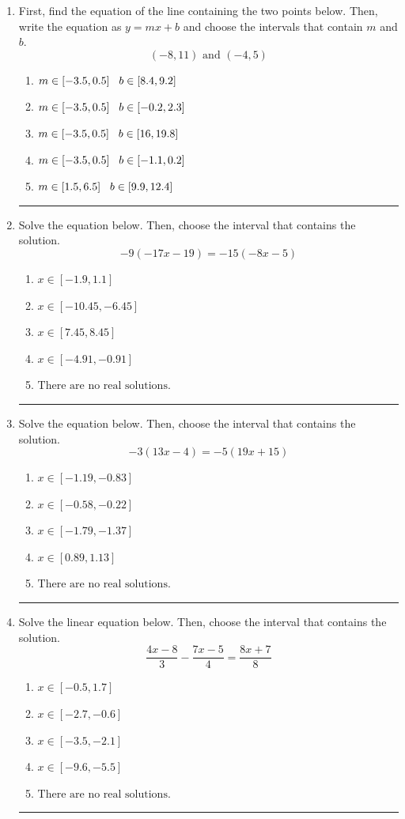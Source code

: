 \documentclass[14pt]{extbook}
\newcommand{\litem}[1]{\item#1\hspace*{-1cm}\rule{\textwidth}{0.4pt}}
\begin{document}
\begin{enumerate}
{\begin{enumerate}[label=\Alph*.]
\end{enumerate} }
\litem{
First, find the equation of the line containing the two points below. Then, write the equation as $ y=mx+b $ and choose the intervals that contain $m$ and $b$.\[ (-8, 11) \text{ and } (-4, 5) \]\begin{enumerate}[label=\Alph*.]
\item \( m \in [-3.5, 0.5] \hspace*{3mm} b \in [8.4, 9.2] \)
\item \( m \in [-3.5, 0.5] \hspace*{3mm} b \in [-0.2, 2.3] \)
\item \( m \in [-3.5, 0.5] \hspace*{3mm} b \in [16, 19.8] \)
\item \( m \in [-3.5, 0.5] \hspace*{3mm} b \in [-1.1, 0.2] \)
\item \( m \in [1.5, 6.5] \hspace*{3mm} b \in [9.9, 12.4] \)

\end{enumerate} }
\litem{
Solve the equation below. Then, choose the interval that contains the solution.\[ -9(-17x -19) = -15(-8x -5) \]\begin{enumerate}[label=\Alph*.]
\item \( x \in [-1.9, 1.1] \)
\item \( x \in [-10.45, -6.45] \)
\item \( x \in [7.45, 8.45] \)
\item \( x \in [-4.91, -0.91] \)
\item \( \text{There are no real solutions.} \)

\end{enumerate} }
\litem{
Solve the equation below. Then, choose the interval that contains the solution.\[ -3(13x -4) = -5(19x + 15) \]\begin{enumerate}[label=\Alph*.]
\item \( x \in [-1.19, -0.83] \)
\item \( x \in [-0.58, -0.22] \)
\item \( x \in [-1.79, -1.37] \)
\item \( x \in [0.89, 1.13] \)
\item \( \text{There are no real solutions.} \)

\end{enumerate} }
\litem{
Solve the linear equation below. Then, choose the interval that contains the solution.\[ \frac{4x -8}{3} - \frac{7x -5}{4} = \frac{8x + 7}{8} \]\begin{enumerate}[label=\Alph*.]
\item \( x \in [-0.5, 1.7] \)
\item \( x \in [-2.7, -0.6] \)
\item \( x \in [-3.5, -2.1] \)
\item \( x \in [-9.6, -5.5] \)
\item \( \text{There are no real solutions.} \)


\end{enumerate}}
\end{enumerate}
\end{document}
